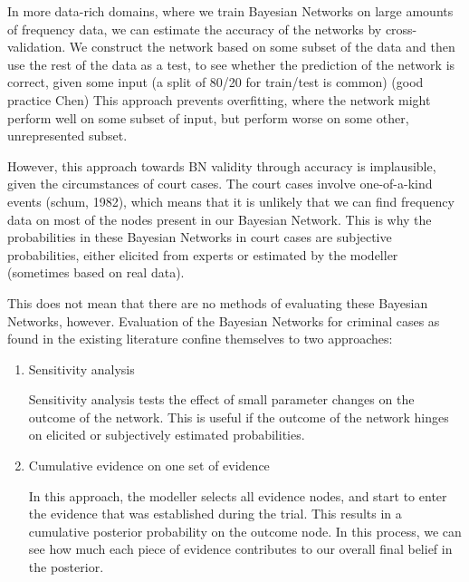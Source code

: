 In more data-rich domains, where we train Bayesian Networks on large amounts of frequency data, we can estimate the accuracy of the networks by cross-validation. We construct the network based on some subset of the data and then use the rest of the data as a test, to see whether the prediction of the network is correct, given some input (a split of 80/20 for train/test is common) (good practice Chen) This approach prevents overfitting, where the network might perform well on some subset of input, but perform worse on some other, unrepresented subset.

However, this approach towards BN validity through accuracy is implausible, given the circumstances of court cases. The court cases involve one-of-a-kind events (schum, 1982), which means that it is unlikely that we can find frequency data on most of the nodes present in our Bayesian Network. This is why the probabilities in these Bayesian Networks in court cases are subjective probabilities, either elicited from experts or estimated by the modeller (sometimes based on real data).

This does not mean that there are no methods of evaluating these Bayesian Networks, however. Evaluation of the Bayesian Networks for criminal cases as found in the existing literature confine themselves to two approaches:

\begin{enumerate}

\item Sensitivity analysis

Sensitivity analysis tests the effect of small parameter changes on the outcome of the network. This is useful if the outcome of the network hinges on elicited or subjectively estimated probabilities. 

\item Cumulative evidence on one set of evidence

In this approach, the modeller selects all evidence nodes, and start to enter the evidence that was established during the trial. This results in a cumulative posterior probability on the outcome node. In this process, we can see how much each piece of evidence contributes to our overall final belief in the posterior.

\end{enumerate}

